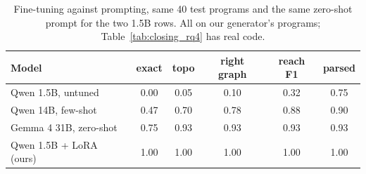 \begin{table}[!h]
\centering
\small
\begin{tabular}{lccccc}
\hline
Model & exact & topo & right graph & reach F1 & parsed \\
\hline
Qwen 1.5B, untuned & 0.00 & 0.05 & 0.10 & 0.32 & 0.75 \\
Qwen 14B, few-shot & 0.47 & 0.70 & 0.78 & 0.88 & 0.90 \\
Gemma 4 31B, zero-shot & 0.75 & 0.93 & 0.93 & 0.93 & 0.93 \\
Qwen 1.5B + LoRA (ours) & 1.00 & 1.00 & 1.00 & 1.00 & 1.00 \\
\hline
\end{tabular}
\caption{Fine-tuning against prompting, same 40 test programs and the same zero-shot prompt for the two 1.5B rows. All on our generator's programs; Table~\ref{tab:closing_rq4} has real code.}\label{tab:finetune}
\end{table}
